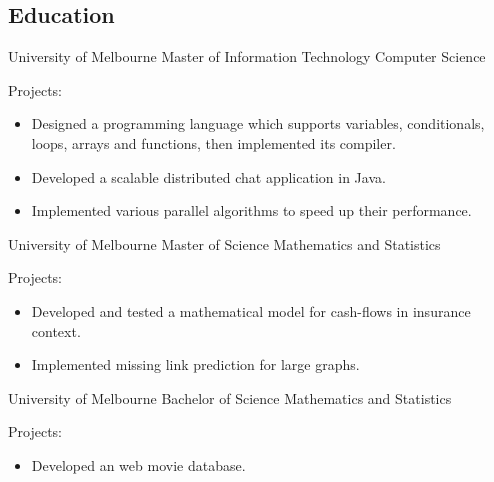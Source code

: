 \documentclass[12pt]{article} %
\begin{document}
\begin{paracol}{2}
\section{Education} 





	{University of Melbourne}
	{Master of Information Technology} %
	{Computer Science}
	{Projects:
		\begin{itemize}
			\setlength{\itemsep}{1pt}	
			\item Designed a programming language which supports variables, conditionals, loops, arrays and functions, then implemented its compiler.
			\item Developed a scalable distributed chat application in Java.   
			\item Implemented various parallel algorithms to speed up their performance.
		\end{itemize}}
	{University of Melbourne}
	{Master of Science} %
	{Mathematics and Statistics}
	{Projects:
		\begin{itemize}
			\setlength{\itemsep}{1pt}	
			\item Developed and tested a mathematical model for cash-flows in insurance context.
			\item Implemented missing link prediction for large graphs.   
		\end{itemize}}
	{University of Melbourne}
	{Bachelor of Science} %
	{Mathematics and Statistics}
	{Projects:
		\begin{itemize}
			\setlength{\itemsep}{1pt}	
			\item Developed an web movie database.   
		\end{itemize}}


\end{paracol}
\end{document}

